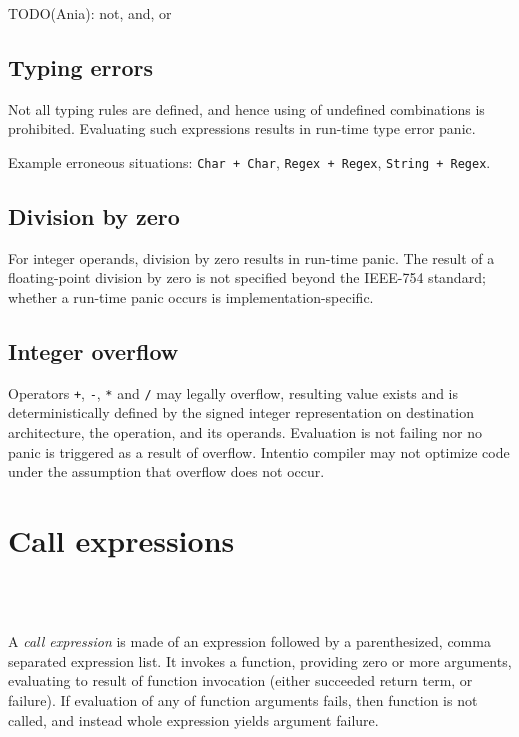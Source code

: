 TODO(Ania): not, and, or

\subsection{Typing errors}

Not all typing rules are defined, and hence using of undefined combinations is prohibited. Evaluating such expressions results in run-time type error panic.

Example erroneous situations: \lstinline{Char + Char}, \lstinline{Regex + Regex}, \lstinline{String + Regex}.

\subsection{Division by zero}

For integer operands, division by zero results in run-time panic. The result of a floating-point division by zero is not specified beyond the IEEE-754\cite{IEEE754} standard; whether a run-time panic occurs is implementation-specific.

\subsection{Integer overflow}

Operators \lstinline{+}, \lstinline{-}, \lstinline{*} and \lstinline{/} may legally overflow, resulting value exists and is deterministically defined by the signed integer representation on destination architecture, the operation, and its operands. Evaluation is not failing nor no panic is triggered as a result of overflow. Intentio compiler may not optimize code under the assumption that overflow does not occur.

\section{Call expressions}

\begin{bnf}
   \eq {} \ \term{(} \  \ \term{)} \\
   \eq {} \  \ \gtry{\term{,}}
\end{bnf}

A \emph{call expression} is made of an expression followed by a parenthesized, comma separated expression list. It invokes a function, providing zero or more arguments, evaluating to result of function invocation (either succeeded return term, or failure). If evaluation of any of function arguments fails, then function is not called, and instead whole expression yields argument failure.

